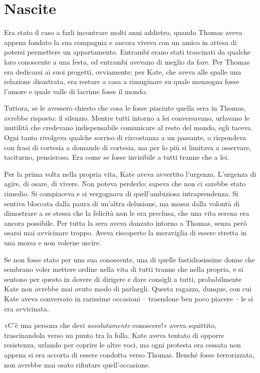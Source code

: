 \chapter{Nascite}
\label{ch:nascite}

Era stato il caso a farli incontrare molti anni addietro, quando Thomas aveva appena fondato la sua
compagnia e ancora viveva con un amico in attesa di potersi permettere un appartamento. Entrambi
erano stati trascinati da qualche loro conoscente a una festa, ed entrambi avevano di meglio da
fare. Per Thomas era dedicarsi ai suoi progetti, ovviamente; per Kate, che aveva alle spalle una
relazione disastrata, era restare a casa a rimuginare su quale menzogna fosse l'amore e quale valle
di lacrime fosse il mondo.

Tuttora, se le avessero chiesto che cosa le fosse piaciuto quella sera in Thomas, avrebbe risposto:
il silenzio. Mentre tutti intorno a lei conversavano, urlavano le inutilità che credevano
indispensabile comunicare al resto del mondo, egli taceva. Ogni tanto rivolgeva qualche sorriso di
circostanza a un passante, o rispondeva con frasi di cortesia a domande di cortesia, ma per lo più
si limitava a osservare, taciturno, pensieroso. Era come se fosse invisibile a tutti tranne che a
lei.

Per la prima volta nella propria vita, Kate aveva avvertito l'urgenza. L'urgenza di agire, di osare,
di vivere. Non poteva perderlo; sapeva che non ci sarebbe stato rimedio. Si compiaceva e si
vergognava di quell'ambiziosa intraprendenza. Si sentiva bloccata dalla paura di un'altra delusione,
ma mossa dalla volontà di dimostrare a se stessa che la felicità non le era preclusa, che una vita
serena era ancora possibile. Per tutta la sera aveva danzato intorno a Thomas, senza però osarsi mai
avvicinare troppo. Aveva riscoperto la meraviglia di essere stretta in una morsa e non volerne
uscire.

Se non fosse stato per una sua conoscente, una di quelle fastidiosissime donne che sembrano voler
mettere ordine nella vita di tutti tranne che nella propria, e si sentono per questo in dovere di
dirigere e dare consigli a tutti, probabilmente Kate non avrebbe mai avuto modo di parlargli. Questa
ragazza, dunque, con cui Kate aveva conversato in rarissime occasioni -- traendone ben poco piacere
-- le si era avvicinata.

«C'è una persona che devi \emph{assolutamente} conoscere!» aveva squittito, trascinandola verso un
punto tra la folla. Kate aveva tentato di opporre resistenza, urlando per coprire le altre voci, ma
ogni protesta era cessata non appena si era accorta di essere condotta verso Thomas. Benché fosse
terrorizzata, non avrebbe mai osato rifiutare quell'occasione.

